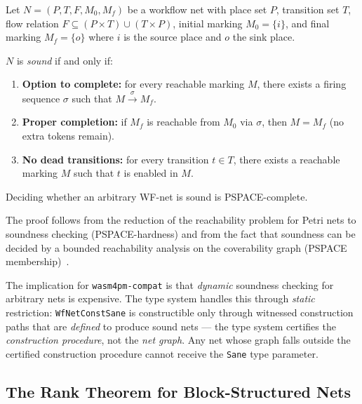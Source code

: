Let $N = (P, T, F, M_0, M_f)$ be a workflow net with place set $P$,
transition set $T$, flow relation $F \subseteq (P \times T) \cup (T \times P)$,
initial marking $M_0 = \{i\}$, and final marking $M_f = \{o\}$ where $i$ is
the source place and $o$ the sink place.

\begin{definition}
$N$ is \emph{sound} if and only if:
\begin{enumerate}
  \item \textbf{Option to complete:} for every reachable marking $M$, there
    exists a firing sequence $\sigma$ such that $M \xrightarrow{\sigma} M_f$.
  \item \textbf{Proper completion:} if $M_f$ is reachable from $M_0$ via
    $\sigma$, then $M = M_f$ (no extra tokens remain).
  \item \textbf{No dead transitions:} for every transition $t \in T$, there
    exists a reachable marking $M$ such that $t$ is enabled in $M$.
\end{enumerate}
\end{definition}

\begin{theorem}
Deciding whether an arbitrary WF-net is sound is PSPACE-complete.
\end{theorem}

The proof follows from the reduction of the reachability problem for Petri nets
to soundness checking (PSPACE-hardness) and from the fact that soundness can be
decided by a bounded reachability analysis on the coverability graph
(PSPACE membership)~\cite{aalst1997verification}.

The implication for \texttt{wasm4pm-compat} is that \emph{dynamic} soundness
checking for arbitrary nets is expensive. The type system handles this through
\emph{static} restriction: \texttt{WfNetConst\langle Sane\rangle} is
constructible only through witnessed construction paths that are
\emph{defined} to produce sound nets --- the type system certifies the
\emph{construction procedure}, not the \emph{net graph}. Any net whose graph
falls outside the certified construction procedure cannot receive the
\texttt{Sane} type parameter.

\subsection{The Rank Theorem for Block-Structured Nets}

